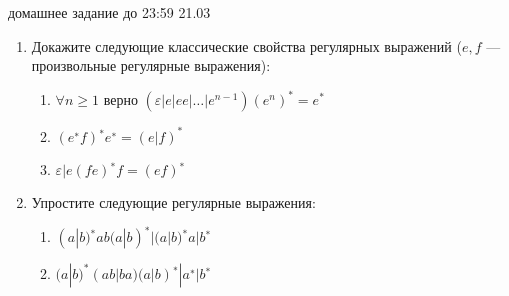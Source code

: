 \documentclass[12pt]{article}
\begin{document}

{\Large домашнее задание до 23:59 21.03}
\bigskip

\begin{enumerate}
  \item
  { Докажите следующие классические свойства регулярных выражений ($e, f$ --- произвольные регулярные выражения): 
    \begin{enumerate}
      \item { $  \forall n \geq 1 $ верно $ (\varepsilon | e | ee | \dots | e^{n−1})(e^{n})^{*} = e^{*} $ }
      \item { $ (e^{∗} f)^{∗} e^{∗} = (e | f)^{*} $ }
      \item { $ \varepsilon | e (fe)^{∗} f = (ef)^{∗} $ }
    \end{enumerate}
  }
  
  \item 
  { Упростите следующие регулярные выражения: 
    \begin{enumerate} 
      \item { $ (a | b)^{∗} ab (a | b)^{∗} | (a | b)^{∗} a | b^{∗} $ }
      \item { $ (a | b)^{*} (ab | ba) (a | b)^{∗} | a^{∗} | b^{∗} $ }
    \end{enumerate}
  }
  

\end{enumerate}
\end{document}
